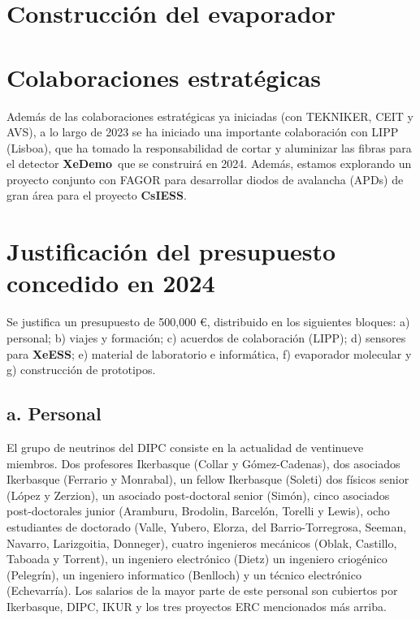 \documentclass[12pt,a4paper,article]{report} %
\def\xess{{\bf XeESS}}
\def\cess{{\bf CsIESS}}
\def\xed{{\bf XeDemo}}
\begin{document}
\section*{Construcción del evaporador}

\section*{Colaboraciones estratégicas}

Además de las colaboraciones estratégicas ya iniciadas (con TEKNIKER, CEIT y AVS), a lo largo de 2023 se ha iniciado una importante colaboración con LIPP (Lisboa), que ha tomado la responsabilidad de cortar y aluminizar las fibras para el detector \xed\ que se construirá en 2024. Además, estamos explorando un proyecto conjunto con FAGOR para
desarrollar diodos de avalancha (APDs) de gran área para el proyecto \cess.


\section*{Justificación del presupuesto concedido en 2024}

Se justifica un presupuesto de 500,000 \euro, distribuido en los siguientes bloques: a) personal; b) viajes y formación; c) acuerdos de colaboración (LIPP);  d) sensores para \xess; e) material de laboratorio e informática, f) evaporador molecular y g) construcción de prototipos.

 \subsection*{a. Personal}

 El grupo de neutrinos del DIPC consiste en la actualidad de ventinueve miembros. Dos profesores Ikerbasque (Collar y Gómez-Cadenas), dos asociados Ikerbasque (Ferrario y Monrabal), un fellow Ikerbasque (Soleti) dos físicos senior (López y Zerzion), un asociado post-doctoral senior (Simón), cinco asociados post-doctorales junior (Aramburu, Brodolin, Barcelón, Torelli y Lewis), ocho estudiantes de doctorado (Valle, Yubero, Elorza, del Barrio-Torregrosa, Seeman, Navarro, Larizgoitia, Donneger), cuatro ingenieros mecánicos (Oblak, Castillo, Taboada y Torrent), un ingeniero electrónico (Dietz) un ingeniero criogénico (Pelegrín), un ingeniero informatico (Benlloch) y un técnico electrónico (Echevarría). Los salarios de la mayor parte de este personal son cubiertos por Ikerbasque, DIPC, IKUR y los tres proyectos ERC mencionados más arriba.
\end{document}
